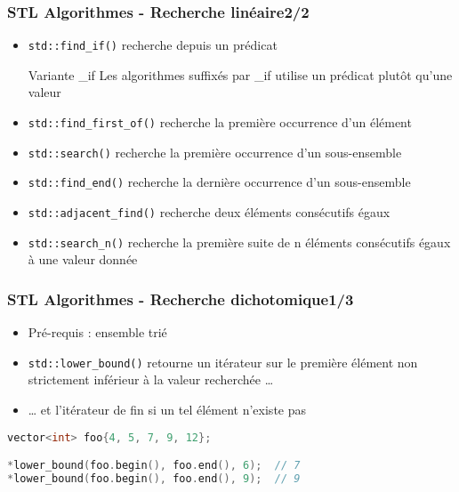 \documentclass[C++.tex]{subfiles}
\begin{document}
\begin{frame}[fragile]
	\frametitle{STL Algorithmes - Recherche linéaire\titlehfill{}2/2}
	\begin{itemize}
		\item \lstinline|std::find_if()| recherche depuis un prédicat

		\begin{block}{Variante \og \_if\fg{}}
			Les algorithmes suffixés par \_if utilise un prédicat plutôt qu'une valeur
		\end{block}

		\item \lstinline|std::find_first_of()| recherche la première occurrence d'un élément
		\item \lstinline|std::search()| recherche la première occurrence d'un sous-ensemble
		\item \lstinline|std::find_end()| recherche la dernière occurrence d'un sous-ensemble
		\item \lstinline|std::adjacent_find()| recherche deux éléments consécutifs égaux
		\item \lstinline|std::search_n()| recherche la première suite de n éléments consécutifs égaux à une valeur donnée

	\end{itemize}
\end{frame}

\begin{frame}[fragile]
	\frametitle{STL Algorithmes - Recherche dichotomique\titlehfill{}1/3}
	\begin{itemize}
		\item Pré-requis : ensemble trié
		\item \lstinline|std::lower_bound()| retourne un itérateur sur le première élément non strictement inférieur à la valeur recherchée \ldots


		\item \ldots{} et l'itérateur de fin si un tel élément n'existe pas
	\end{itemize}

	\begin{lstlisting}[language=C++]
vector<int> foo{4, 5, 7, 9, 12};

*lower_bound(foo.begin(), foo.end(), 6);  // 7
*lower_bound(foo.begin(), foo.end(), 9);  // 9\end{lstlisting}
\end{frame}
\end{document}
